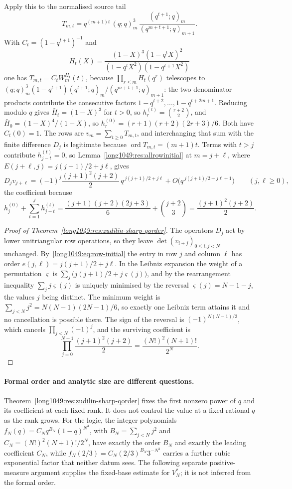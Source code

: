 \documentclass[11pt]{article}
\begin{document}
\noindent Apply this to the normalised source tail
\[
 T_{m,t}=q^{(m+1)t}\,(q;q)_m^{3}\,\frac{(q^{t+1};q)_m}{(q^{m+t+1};q)_{m+1}} .
\]
With $C_t=(1-q^{t+1})^{-1}$ and
\[
 H_t(X)=\frac{(1-X)^{3}(1-q^{t}X)^{2}}{(1-q^{t}X^{2})(1-q^{t+1}X^{2})}
\]
one has $T_{m,t}=C_tW_m^{H_t}(t)$, because
$\prod_{r\le m}H_t(q^{r})$ telescopes to
$(q;q)_m^{3}(1-q^{t+1})(q^{t+1};q)_m/(q^{m+t+1};q)_{m+1}$: the two denominator
products contribute the consecutive factors $1-q^{t+2},\dots,1-q^{t+2m+1}$.
Reducing modulo $q$ gives $\bar H_t=(1-X)^{3}$ for $t>0$, so
$h^{(t)}_r=\binom{r+2}{2}$, and $\bar H_0=(1-X)^{4}/(1+X)$, so
$h^{(0)}_r=(r+1)(r+2)(2r+3)/6$.  Both have $C_t(0)=1$.  The rows are
$v_m=\sum_{t\ge0}T_{m,t}$, and interchanging that sum with the finite
difference $D_j$ is legitimate because $\operatorname{ord}T_{m,t}=(m+1)t$.  Terms
with $t>j$ contribute $h^{(t)}_{j-t}=0$, so Lemma~\ref{long1049:res:allrowinitial} at
$m=j+\ell$, where $E(j+\ell,j)=j(j+1)/2+j\ell$, gives
\begin{equation}\label{long1049:eq:row-initial}
 D_jv_{j+\ell}=(-1)^{j}\frac{(j+1)^{2}(j+2)}2\,q^{\,j(j+1)/2+j\ell}
 +O\bigl(q^{\,j(j+1)/2+j\ell+1}\bigr)
 \qquad(j,\ell\ge0),
\end{equation}
the coefficient because
\[
 h^{(0)}_j+\sum_{t=1}^{j}h^{(t)}_{j-t}
 =\frac{(j+1)(j+2)(2j+3)}6+\binom{j+2}3
 =\frac{(j+1)^{2}(j+2)}2 .
\]

\begin{proof}[Proof of Theorem~\ref{long1049:res:zudilin-sharp-qorder}]
The operators $D_j$ act by lower unitriangular row operations, so they leave
$\det(v_{i+j})_{0\le i,j<N}$ unchanged.  By~\eqref{long1049:eq:row-initial} the entry in
row $j$ and column $\ell$ has order $e(j,\ell)=j(j+1)/2+j\ell$.  In the Leibniz
expansion the weight of a permutation $\varsigma$ is
$\sum_j\bigl(j(j+1)/2+j\varsigma(j)\bigr)$, and by the rearrangement inequality
$\sum_jj\varsigma(j)$ is uniquely minimised by the reversal
$\varsigma(j)=N-1-j$, the values $j$ being distinct.  The minimum weight is
$\sum_{j<N}j^{2}=N(N-1)(2N-1)/6$, so exactly one Leibniz term attains it and no
cancellation is possible there.  The sign of the reversal is
$(-1)^{N(N-1)/2}$, which cancels $\prod_{j<N}(-1)^{j}$, and the surviving
coefficient is
\[
 \prod_{j=0}^{N-1}\frac{(j+1)^{2}(j+2)}2=\frac{(N!)^{2}(N+1)!}{2^{N}} .
\]
\end{proof}

\paragraph{Formal order and analytic size are different questions.}
Theorem~\ref{long1049:res:zudilin-sharp-qorder} fixes the first nonzero power of $q$ and
its coefficient at each fixed rank.  It does not control the value at a fixed
rational $q$ as the rank grows.  For the logic, the integer polynomials
$f_N(q)=C_Nq^{B_N}(1-q)^{N^{3}}$, with $B_N=\sum_{j<N}j^{2}$ and
$C_N=(N!)^{2}(N+1)!/2^{N}$, have exactly the order $B_N$ and exactly the leading
coefficient $C_N$, while $f_N(2/3)=C_N(2/3)^{B_N}3^{-N^{3}}$ carries a further
cubic exponential factor that neither datum sees.  The following separate
positive-measure argument supplies the fixed-base estimate for $V_N^*$;
it is not inferred from the formal order.
\end{document}
